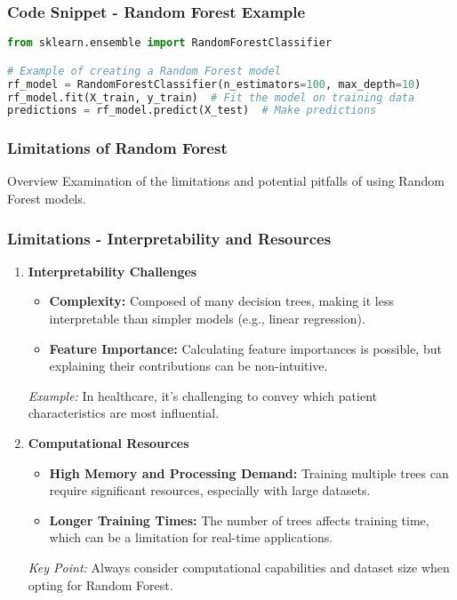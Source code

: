 \documentclass[aspectratio=169]{beamer}
\begin{document}
\begin{frame}[fragile]
    \frametitle{Code Snippet - Random Forest Example}
    \begin{lstlisting}[language=Python]
from sklearn.ensemble import RandomForestClassifier

# Example of creating a Random Forest model
rf_model = RandomForestClassifier(n_estimators=100, max_depth=10)
rf_model.fit(X_train, y_train)  # Fit the model on training data
predictions = rf_model.predict(X_test)  # Make predictions
    \end{lstlisting}
\end{frame}

\begin{frame}[fragile]
    \frametitle{Limitations of Random Forest}
    \begin{block}{Overview}
        Examination of the limitations and potential pitfalls of using Random Forest models.
    \end{block}
\end{frame}

\begin{frame}[fragile]
    \frametitle{Limitations - Interpretability and Resources}
    \begin{enumerate}
        \item \textbf{Interpretability Challenges}
            \begin{itemize}
                \item \textbf{Complexity:} Composed of many decision trees, making it less interpretable than simpler models (e.g., linear regression).
                \item \textbf{Feature Importance:} Calculating feature importances is possible, but explaining their contributions can be non-intuitive.
            \end{itemize}
            \textit{Example:} In healthcare, it's challenging to convey which patient characteristics are most influential.

        \item \textbf{Computational Resources}
            \begin{itemize}
                \item \textbf{High Memory and Processing Demand:} Training multiple trees can require significant resources, especially with large datasets.
                \item \textbf{Longer Training Times:} The number of trees affects training time, which can be a limitation for real-time applications.
            \end{itemize}
            \textit{Key Point:} Always consider computational capabilities and dataset size when opting for Random Forest.
    \end{enumerate}
\end{frame}
\end{document}
